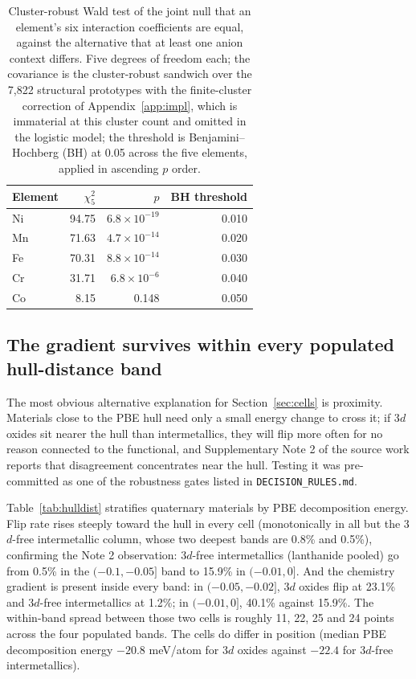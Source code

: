 \documentclass[11pt]{article}
\begin{document}
\begin{table}[htbp]\centering
\caption{Cluster-robust Wald test of the joint null that an element's six interaction
coefficients are equal, against the alternative that at least one anion context differs.
Five degrees of freedom each; the covariance is the cluster-robust sandwich over the
7{,}822 structural prototypes with the finite-cluster correction of
Appendix~\ref{app:impl}, which is immaterial at this cluster count and omitted in the
logistic model; the threshold is
Benjamini--Hochberg (BH) at 0.05 across the five elements, applied in ascending $p$
order.}
\label{tab:jointtest}
\small\begin{tabular}{lrrr}
\toprule
Element & $\chi^2_5$ & $p$ & BH threshold \\
\midrule
Ni & 94.75 & $6.8\times10^{-19}$ & 0.010 \\
Mn & 71.63 & $4.7\times10^{-14}$ & 0.020 \\
Fe & 70.31 & $8.8\times10^{-14}$ & 0.030 \\
Cr & 31.71 & $6.8\times10^{-6}$  & 0.040 \\
Co & \phantom{0}8.15 & 0.148 & 0.050 \\
\bottomrule
\end{tabular}
\end{table}

\subsection{The gradient survives within every populated hull-distance band}\label{sec:hulldist}

The most obvious alternative explanation for Section~\ref{sec:cells} is proximity.
Materials close to the PBE hull need only a small energy change to cross it; if 3$d$
oxides sit nearer the hull than intermetallics, they will flip more often for no reason
connected to the functional, and Supplementary Note 2 of the source work reports that
disagreement concentrates near the hull. Testing it was pre-committed as one of the robustness gates listed in
\texttt{DECISION\_RULES.md}.

Table~\ref{tab:hulldist} stratifies quaternary materials by PBE decomposition energy.
Flip rate rises steeply toward the hull in every cell (monotonically in all but the
3$d$-free intermetallic column, whose two deepest bands are 0.8\% and 0.5\%), confirming the
Note 2 observation: 3$d$-free intermetallics (lanthanide pooled) go from 0.5\% in the $(-0.1,-0.05]$ band to 15.9\% in
$(-0.01,0]$. And the chemistry gradient is present inside every band: in
$(-0.05,-0.02]$, 3$d$ oxides flip at 23.1\% and 3$d$-free intermetallics at 1.2\%; in
$(-0.01,0]$, 40.1\% against 15.9\%. The within-band spread between those two cells is
roughly 11, 22, 25 and 24 points across the four populated bands. The cells do differ in position (median PBE decomposition energy $-20.8$ meV/atom for
3$d$ oxides against $-22.4$ for 3$d$-free intermetallics).
\end{document}
